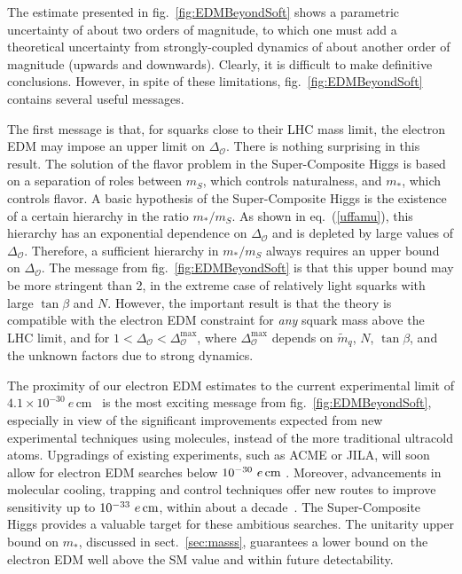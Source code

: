 \documentclass[a4paper,12pt]{article}
\def\eq#1{eq.~(\ref{#1})}
\def\fig#1{fig.~\ref{#1}}
\def\eq#1{eq.~(\ref{#1})}
\def\fig#1{fig.~\ref{#1}}
\def\sec#1{sect.~\ref{#1}}
\def\O{\mathcal{O}}
\def\mst{m_*}
\def\mS{m_S}
\begin{document}
{{{{The estimate presented in \fig{fig:EDMBeyondSoft} shows a parametric uncertainty of about two orders of magnitude, to which one must add a theoretical uncertainty from strongly-coupled dynamics of about another order of magnitude (upwards and downwards). Clearly, it is difficult to make definitive conclusions. However, in spite of these limitations, \fig{fig:EDMBeyondSoft} contains several useful messages.

The first message is that, for squarks close to their LHC mass limit,  the electron EDM may impose an upper limit on $\Delta_\O$. There is nothing surprising in this result. The solution of the flavor problem in the Super-Composite Higgs is based on a separation of roles between $\mS$, which controls naturalness, and $\mst$, which controls flavor. A basic hypothesis of the Super-Composite Higgs is the existence of a certain hierarchy in the ratio $\mst/\mS$. As shown in \eq{uffamu}, this hierarchy has an exponential dependence on $\Delta_\O$ and is depleted by large values of $\Delta_\O$. Therefore, a sufficient hierarchy in $\mst/\mS$ always requires an upper bound on $\Delta_\O$. The message from \fig{fig:EDMBeyondSoft} is that this upper bound may be more stringent than 2, in the extreme case of relatively light squarks with large $\tan\beta$ and $N$. However, the important result is that the theory is compatible with the electron EDM constraint for {\it any} squark mass above the LHC limit, and for $1<\Delta_\O< \Delta_\O^{\textrm{max}}$, where $\Delta_\O^{\textrm{max}}$ depends on ${\tilde m}_q$, $N$, $\tan\beta$, and the unknown factors due to strong dynamics.

The proximity of our electron EDM estimates to the current experimental limit of $4.1 \times 10^{-30}~e\,$cm~\cite{Roussy:2022cmp} is the most exciting message from \fig{fig:EDMBeyondSoft}, especially in view of the significant improvements expected from new experimental techniques using molecules, instead of the more traditional ultracold atoms. Upgradings of existing experiments, such as ACME or JILA, will soon allow for electron EDM searches below $10^{-30} ~e\,{\rm cm}$ \cite{Wu:2022yqp,Ang:2022ikd}. Moreover, advancements in molecular cooling, trapping and control techniques offer new routes to improve sensitivity up to $10^{-33} ~e\,{\rm cm}$, within about a decade~\cite{DeMille:2024djy}. The Super-Composite Higgs provides a valuable target for these ambitious searches. The unitarity upper bound on $\mst$, discussed in \sec{sec:masss}, guarantees a lower bound on the electron EDM well above the SM value and within future detectability.

}}}}
\end{document}
